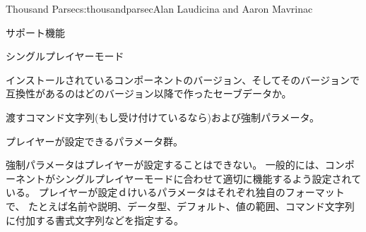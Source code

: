 \begin{aosachapter}{Thousand Parsec}{s:thousandparsec}{Alan Laudicina and Aaron Mavrinac}
\begin{aosasect1}{サポート機能}
\begin{aosasect2}{シングルプレイヤーモード}
\begin{aosaitemize}
  \item インストールされているコンポーネントのバージョン、そしてそのバージョンで互換性があるのはどのバージョン以降で作ったセーブデータか。

  \item 渡すコマンド文字列(もし受け付けているなら)および強制パラメータ。

  \item プレイヤーが設定できるパラメータ群。

\end{aosaitemize}

強制パラメータはプレイヤーが設定することはできない。
一般的には、コンポーネントがシングルプレイヤーモードに合わせて適切に機能するよう設定されている。
プレイヤーが設定ｄけいるパラメータはそれぞれ独自のフォーマットで、
たとえば名前や説明、データ型、デフォルト、値の範囲、コマンド文字列に付加する書式文字列などを指定する。


\end{aosasect2}
\end{aosasect1}
\end{aosachapter}
